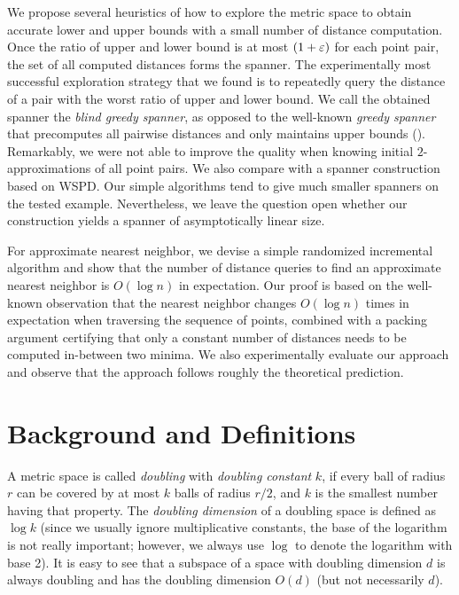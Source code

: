 \documentclass[a4paper,UKenglish,cleveref, autoref]{lipics-v2019}
\begin{document}
We propose several heuristics of how to explore the metric space to obtain accurate lower and upper bounds
with a small number of distance computation. Once the ratio of upper and lower bound is at most $(1+\varepsilon)$
for each point pair, the set of all computed distances forms the spanner.
The experimentally most successful exploration strategy that we found is to
repeatedly query the distance of a pair with the worst ratio of upper and lower bound.
We call the obtained spanner the \emph{blind greedy spanner}, as opposed to the well-known
\emph{greedy spanner} that precomputes all pairwise distances and only maintains upper bounds (\cite{althofer1993sparse}).
Remarkably, we were not able to improve the quality when knowing initial $2$-approximations of all point pairs.
We also compare with a spanner construction based on WSPD. Our simple algorithms tend to give much smaller
spanners on the tested example. Nevertheless, we leave the question open whether our construction
yields a spanner of asymptotically linear size.

For approximate nearest neighbor, we devise a simple randomized incremental algorithm and show that
the number of distance queries to find an approximate nearest neighbor is $O(\log n)$ in expectation.
Our proof is based on the well-known observation that the nearest neighbor changes $O(\log n)$ times
in expectation when traversing the sequence of points, combined with a packing argument certifying that
only a constant number of distances needs to be computed in-between two minima.
We also experimentally evaluate our approach and observe that the approach follows 
roughly the theoretical prediction.

\section{Background and Definitions}
%
A metric space is called \textit{doubling} with \textit{doubling constant} $k$,
if every ball of radius $r$ can be covered by at most $k$ balls of radius $r/2$,
and $k$ is the smallest number having that property.
The \textit{doubling dimension} of a doubling space is defined as $\log k$
(since we usually ignore multiplicative constants, the base of the logarithm is not really important; however,
we always use $\log$ to denote the logarithm with base 2).
It is easy to see that a subspace of a space with doubling dimension $d$ 
is always doubling and has the doubling dimension $O(d)$ (but not necessarily $d$).
\end{document}
